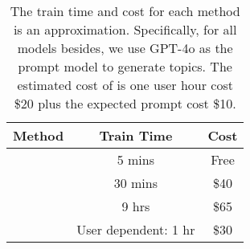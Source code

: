 \label{sec:cost}
\begin{table}[h!]
\small
\centering
\begin{tabular}{ccc}
\hline
{\bf Method} & {\bf Train Time} &  {\bf Cost}  \\ \hline
\lda{} & 5 mins & Free \\ 
\lloom{} & 30 mins & \$40 \\ 
\topicgpt{} & 9 hrs & \$65 \\
\bass{} & User dependent: 1 hr & \$30 \\
\hline
\end{tabular}
\caption{The train time and cost for each method is an approximation. Specifically, for all models besides, we use GPT-4o as the prompt model to generate topics. The estimated cost of \bass{} is one user hour cost \$20 plus the expected prompt cost \$10.}
\label{tab:cost}
\end{table}



